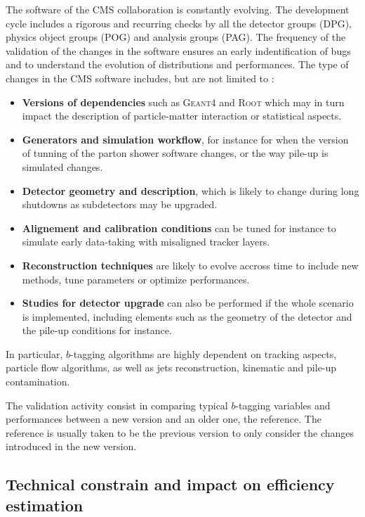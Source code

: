     The software of the CMS collaboration is constantly evolving. The development cycle
    includes a rigorous and recurring checks by all the detector groups (DPG), physics
    object groups (POG) and analysis groups (PAG). The frequency of the validation of the
    changes in the software ensures an early indentification of bugs and to understand
    the evolution of distributions and performances. The type of changes in the CMS
    software includes, but are not limited to :
    \begin{itemize}
        \item \textbf{Versions of dependencies} such as \textsc{Geant4} and
              \textsc{Root} which may in turn impact the description of particle-matter
              interaction or statistical aspects.
        \item \textbf{Generators and simulation workflow}, for instance for when the
              version of tunning of the parton shower software changes, or the way pile-up
              is simulated changes.
        \item \textbf{Detector geometry and description}, which is likely to change during
              long shutdowns as subdetectors may be upgraded.
        \item \textbf{Alignement and calibration conditions} can be tuned for instance to
              simulate early data-taking with misaligned tracker layers.
        \item \textbf{Reconstruction techniques} are likely to evolve accross time to include
              new methods, tune parameters or optimize performances.
        \item \textbf{Studies for detector upgrade} can also be performed if the whole
              scenario is implemented, including elements such as the geometry of the
              detector and the pile-up conditions for instance.
    \end{itemize}

    In particular, $b$-tagging algorithms are highly dependent on tracking aspects,
    particle flow algorithms, as well as jets reconstruction, kinematic and pile-up contamination.

    The validation activity consist in comparing typical $b$-tagging variables and performances
    between a new version and an older one, the reference. The reference is usually taken to
    be the previous version to only consider the changes introduced in the new version.

    \subsection{Technical constrain and impact on efficiency estimation}

